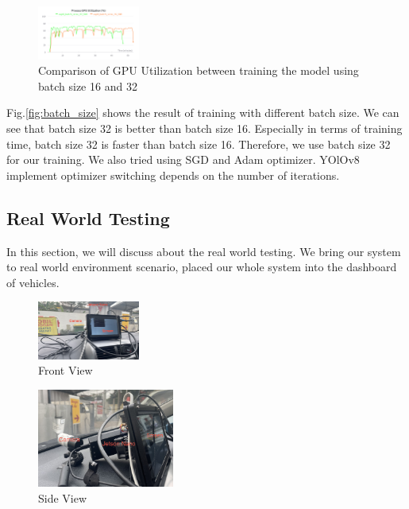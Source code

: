 \documentclass[conference]{IEEEtran}
\begin{document}
\begin{figure}[h!]
\centering
\includegraphics[width=0.3\textwidth,keepaspectratio]{gpu_utilization_comparison.png} 
\caption{Comparison of GPU Utilization between training the model using batch size 16 and 32}
\label{fig:gpu_utilization}
\end{figure}
Fig.\ref{fig:batch_size} shows the result of training with different batch size. We can see that batch size 32 is better than batch size 16. Especially in terms of training time, batch size 32 is faster than batch size 16.
Therefore, we use batch size 32 for our training. We also tried using SGD and Adam optimizer. YOlOv8 implement optimizer switching depends on the number of iterations.




\subsection{Real World Testing}
In this section, we will discuss about the real world testing. We bring our system to real world environment scenario, placed our whole system into the dashboard of vehicles.
\begin{figure}[h!]
    \centering
    \includegraphics[width=0.3\textwidth,keepaspectratio]{mounted_camera_front_view.jpg}
    \caption{Front View}
    \label{fig:front_view}
\end{figure}

\begin{figure}[h!]
    \centering
    \includegraphics[width=0.4\textwidth,keepaspectratio]{mounted_camera_side_view.jpg}
    \caption{Side View}
    \label{fig:side_view}
\end{figure}
\end{document}
